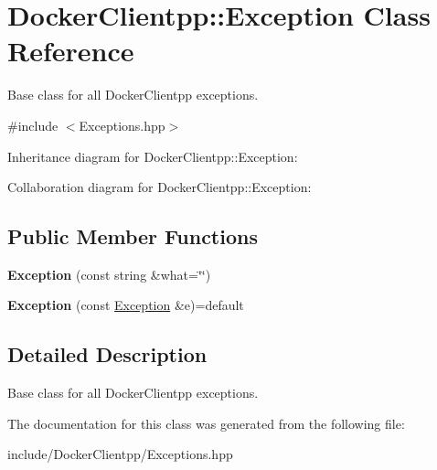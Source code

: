 \hypertarget{classDockerClientpp_1_1Exception}{}\section{Docker\+Clientpp\+::Exception Class Reference}
\label{classDockerClientpp_1_1Exception}


Base class for all Docker\+Clientpp exceptions.  




{\ttfamily \#include $<$Exceptions.\+hpp$>$}



Inheritance diagram for Docker\+Clientpp\+::Exception\+:


Collaboration diagram for Docker\+Clientpp\+::Exception\+:
\subsection*{Public Member Functions}
\begin{DoxyCompactItemize}
\item 
\mbox{\label{classDockerClientpp_1_1Exception_a58ce889f1bf6ffd0ff552ae69f2714c3}} 
{\bfseries Exception} (const string \&what=\char`\"{}\char`\"{})
\item 
\mbox{\label{classDockerClientpp_1_1Exception_a5ed4a5caf82137ae8350584e4748fb35}} 
{\bfseries Exception} (const \mbox{\hyperlink{classDockerClientpp_1_1Exception}{Exception}} \&e)=default
\end{DoxyCompactItemize}


\subsection{Detailed Description}
Base class for all Docker\+Clientpp exceptions. 

The documentation for this class was generated from the following file\+:\begin{DoxyCompactItemize}
\item 
include/\+Docker\+Clientpp/Exceptions.\+hpp\end{DoxyCompactItemize}

